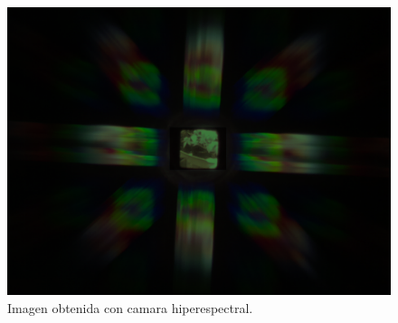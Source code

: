 \begin{figure}[h]
\begin{center}
\includegraphics[scale=.2256]{./images/RESULTS/Malvar/mosaic.png}
\end{center}
\caption{Imagen obtenida con camara hiperespectral.}
\label{pics:originalHDR}
\end{figure}

